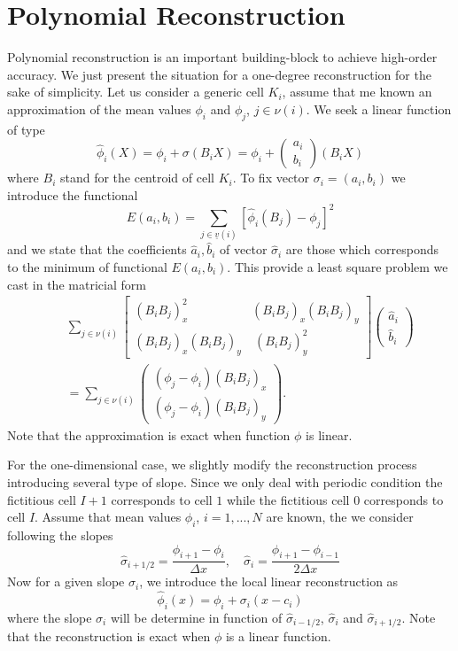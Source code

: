 \section{Polynomial Reconstruction}
\label{sec:300}
Polynomial reconstruction is an important building-block to achieve high-order accuracy. We just present the situation for a one-degree reconstruction for the sake of simplicity. Let us consider
a generic cell $K_i$, assume that me known an approximation of the mean values $\phi_i$ and
$\phi_j$, $j\in\nu(i)$. We seek a linear function of type
$$ 
\widehat{\phi}_i(X) = \phi_i + \sigma(B_iX)=
\phi_i + \left( \begin{array}{c}a_i \\ b_i \end{array}\right) (B_iX)
$$
where $B_i$ stand for the centroid of cell $K_i$. To fix vector $\sigma_i=(a_i,b_i)$ 
we introduce the functional 
$$
E(a_i,b_i) = \sum_{j \in \underline{v}(i)} [\widehat{\phi}_i(B_j) - \phi_j]^2 
$$
and we state that the coefficients $\widehat a_i,\widehat b_i$ of vector $\widehat \sigma_i$ 
are those which corresponds to the minimum of 
functional $E(a_i,b_i)$.
This provide a least square problem we cast in the matricial form
\begin{eqnarray*}
& &\sum_{j\in\nu(i)} \left [\begin{array}{cc}
(B_iB_j)^2_x &  (B_iB_j)_x(B_iB_j)_y \\
(B_iB_j)_x(B_iB_j)_y &\ (B_iB_j)^2_y 
\end{array}\right ]
\left( \begin{array}{c}
\widehat a_i \\ \widehat b_i 
\end{array}\right)\\
& &=
\sum_{j\in\nu(i)} \left( \begin{array}{c}
(\phi_j-\phi_i)(B_iB_j)_x\\
 (\phi_j-\phi_i)(B_iB_j)_y
\end{array}\right).
\end{eqnarray*}
Note that the approximation is exact when  function $\phi$ is linear.

For the one-dimensional case, we slightly modify the reconstruction process introducing several 
type of slope. Since we only deal with periodic condition the fictitious cell $I+1$ corresponds
to cell $1$ while the fictitious cell $0$ corresponds to cell $I$. Assume that mean values
$\phi_i$, $i=1,...,N$ are known, the we consider following the slopes
$$
\widehat \sigma_{i+1/2}=\frac{\phi_{i+1}-\phi_i}{\Delta x}, \quad 
\widehat \sigma_i=\frac{\phi_{i+1}-\phi_{i-1}}{2\Delta x}
$$
Now for a given slope $\sigma_i$, we introduce the local linear reconstruction as
$$
\widehat \phi_i(x)=\phi_i+\sigma_i(x-c_i)
$$
where the slope $\sigma_i$ will be determine in function of  $\widehat \sigma_{i-1/2}$,
$\widehat \sigma_{i}$ and $\widehat \sigma_{i+1/2}$.
Note that the reconstruction is exact when $\phi$ is a linear function.
